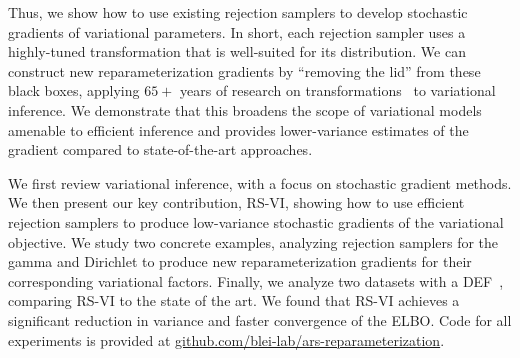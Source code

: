 Thus, we show how to use existing rejection samplers to develop
stochastic gradients of variational parameters.  In short, each
rejection sampler uses a highly-tuned transformation that is
well-suited for its distribution.  We can construct new
reparameterization gradients by ``removing the lid'' from these black
boxes, applying $65+$ years of research on
transformations~\citep{vonneumann:51, devroye1986} to variational
inference. We demonstrate that this broadens the scope of variational
models amenable to efficient inference and provides lower-variance
estimates of the gradient compared to state-of-the-art approaches.

We first review variational inference, with a focus on stochastic
gradient methods. We then present our key contribution, \gls{RS-VI},
showing how to use efficient rejection samplers to produce
low-variance stochastic gradients of the variational objective.  We
study two concrete examples, analyzing rejection samplers for the
gamma and Dirichlet to produce new reparameterization gradients for
their corresponding variational factors. Finally, we analyze two
datasets with a \gls{DEF}~\citep{Ranganath2015}, comparing \gls{RS-VI}
to the state of the art.  We found that \gls{RS-VI} achieves a
significant reduction in variance and faster convergence of the
\gls{ELBO}. 
Code for all experiments is provided at
\url{github.com/blei-lab/ars-reparameterization}.



